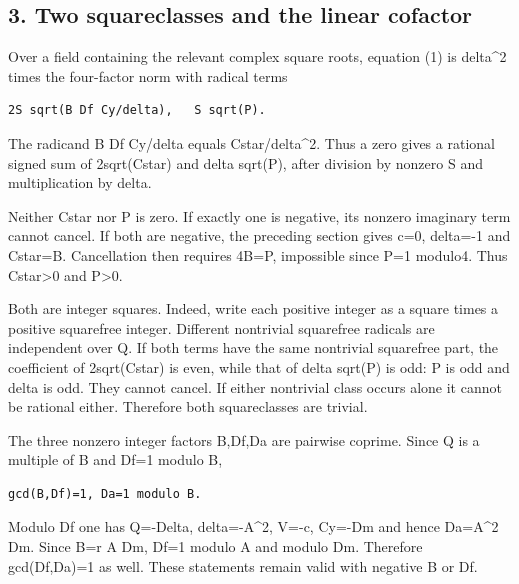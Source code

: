 \subsection{3. Two squareclasses and the linear cofactor}



Over a field containing the relevant complex square roots, equation (1) is delta\textasciicircum{}\allowbreak{}2 times the four-factor norm with radical terms



\begin{verbatim}
2S sqrt(B Df Cy/delta),   S sqrt(P).
\end{verbatim}

The radicand B Df Cy/\allowbreak{}delta equals Cstar/\allowbreak{}delta\textasciicircum{}\allowbreak{}2. Thus a zero gives a rational signed sum of 2sqrt(Cstar) and delta sqrt(P), after division by nonzero S and multiplication by delta.



Neither Cstar nor P is zero. If exactly one is negative, its nonzero imaginary term cannot cancel. If both are negative, the preceding section gives c=\allowbreak{}0, delta=\allowbreak{}-1 and Cstar=\allowbreak{}B. Cancellation then requires 4B=\allowbreak{}P, impossible since P=\allowbreak{}1 modulo4. Thus Cstar\textgreater{}\allowbreak{}0 and P\textgreater{}\allowbreak{}0.



Both are integer squares. Indeed, write each positive integer as a square times a positive squarefree integer. Different nontrivial squarefree radicals are independent over Q. If both terms have the same nontrivial squarefree part, the coefficient of 2sqrt(Cstar) is even, while that of delta sqrt(P) is odd: P is odd and delta is odd. They cannot cancel. If either nontrivial class occurs alone it cannot be rational either. Therefore both squareclasses are trivial.



The three nonzero integer factors B,Df,Da are pairwise coprime. Since Q is a multiple of B and Df=\allowbreak{}1 modulo B,



\begin{verbatim}
gcd(B,Df)=1, Da=1 modulo B.
\end{verbatim}

Modulo Df one has Q=\allowbreak{}-Delta, delta=\allowbreak{}-A\textasciicircum{}\allowbreak{}2, V=\allowbreak{}-c, Cy=\allowbreak{}-Dm and hence Da=\allowbreak{}A\textasciicircum{}\allowbreak{}2 Dm. Since B=\allowbreak{}r A Dm, Df=\allowbreak{}1 modulo A and modulo Dm. Therefore gcd(Df,Da)=\allowbreak{}1 as well. These statements remain valid with negative B or Df.



